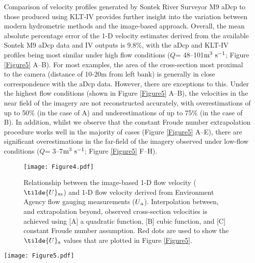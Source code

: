 \documentclass[hess, manuscript]{copernicus}
\begin{document}
Comparison of velocity profiles generated by Sontek River Surveyor M9 aDcp to those produced using KLT-IV provides further insight into the variation between modern hydrometric methods \citep{ISO24578} and the image-based approach. Overall, the mean absolute percentage error of the 1-D velocity estimates derived from the available Sontek M9 aDcp data and IV outputs is 9.8\%, with the aDcp and KLT-IV profiles being most similar under high flow conditions (${Q}$= 48--101$\textnormal{m\textsuperscript{3} s\textsuperscript{-1}}$; Figure \ref{Figure5} A--B). For most examples, the area of the cross-section most proximal to the camera (distance of 10-20m from left bank) is generally in close correspondence with the aDcp data. However, there are exceptions to this. Under the highest flow conditions (shown in Figure \ref{Figure5} A--B), the velocities in the near field of the imagery are not reconstructed accurately, with overestimations of up to 50\% (in the case of A) and underestimations of up to 75\% (in the case of B). In addition, whilst we observe that the constant Froude number extrapolation procedure works well in the majority of cases (Figure \ref{Figure5} A--E), there are significant overestimations in the far-field of the imagery observed under low-flow conditions (${Q}$= 3--7$\textnormal{m\textsuperscript{3} s\textsuperscript{-1}}$; Figure \ref{Figure5} F--H).


\begin{figure}[H]
\centering 
\texttt{[image: Figure4.pdf]}
\caption{Relationship between the image-based 1-D flow velocity ($\tilde{U}\textsubscript{xs}$) and 1-D flow velocity derived from Environment Agency flow gauging measurements ($U\textsubscript{a}$). Interpolation between, and extrapolation beyond, observed cross-section velocities is achieved using [A] a quadratic function, [B] cubic function, and [C] constant Froude number assumption. Red dots are used to show the $\tilde{U}\textsubscript{a}$ values that are plotted in Figure \ref{Figure5}.}
\label{Figure4} 
\end{figure}

\begin{figure*}[!htb]
\centering\Large
\texttt{[image: Figure5.pdf]}
\caption{A selection of cross-section velocities illustrating the deviation between the Sontek aDcp velocity magnitudes (grey circles) and KLT-IV generated velocities for a range of flow conditions. Measured velocities are shown by the red filled circles, whereas estimates based on the constant Froude number assumption are shown by the red open circles. Error bars illustrate the standard deviation of stationary aDcp measurements. Flow discharge measurements for the aDcp transects are presented in each subplot along with the percent difference between discharge reported by aDcp and the reconstructed discharge using KLT-IV.}
\label{Figure5} 
\end{figure*}
\end{document}
